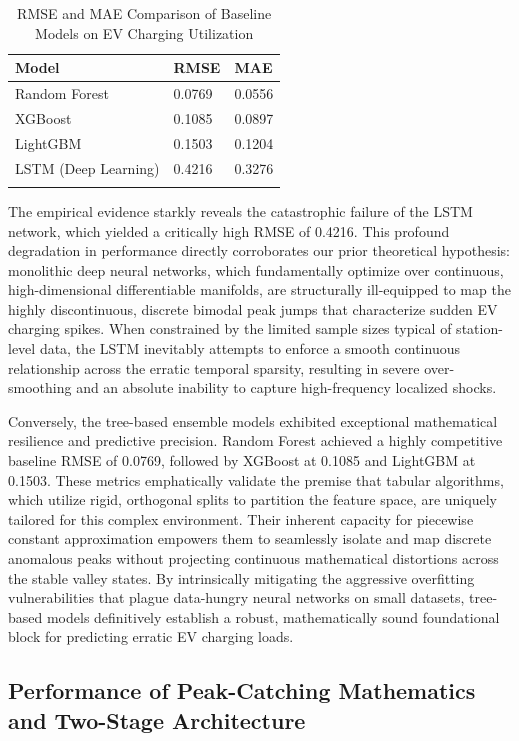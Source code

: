 \documentclass[pdflatex,sn-mathphys-num]{sn-jnl}%
\theoremstyle{thmstyleone}%
\theoremstyle{thmstyletwo}%
\theoremstyle{thmstylethree}%
\begin{document}
\begin{table}[h]
\caption{RMSE and MAE Comparison of Baseline Models on EV Charging Utilization}\label{tab:rmse_comparison}
\begin{tabular}{@{}lll@{}}
\toprule
Model & RMSE & MAE \\
\midrule
Random Forest & 0.0769 & 0.0556 \\
XGBoost & 0.1085 & 0.0897 \\
LightGBM & 0.1503 & 0.1204 \\
LSTM (Deep Learning) & 0.4216 & 0.3276 \\
\botrule
\end{tabular}
\end{table}

The empirical evidence starkly reveals the catastrophic failure of the LSTM network, which yielded a critically high RMSE of 0.4216. This profound degradation in performance directly corroborates our prior theoretical hypothesis: monolithic deep neural networks, which fundamentally optimize over continuous, high-dimensional differentiable manifolds, are structurally ill-equipped to map the highly discontinuous, discrete bimodal peak jumps that characterize sudden EV charging spikes. When constrained by the limited sample sizes typical of station-level data, the LSTM inevitably attempts to enforce a smooth continuous relationship across the erratic temporal sparsity, resulting in severe over-smoothing and an absolute inability to capture high-frequency localized shocks.

Conversely, the tree-based ensemble models exhibited exceptional mathematical resilience and predictive precision. Random Forest achieved a highly competitive baseline RMSE of 0.0769, followed by XGBoost at 0.1085 and LightGBM at 0.1503. These metrics emphatically validate the premise that tabular algorithms, which utilize rigid, orthogonal splits to partition the feature space, are uniquely tailored for this complex environment. Their inherent capacity for piecewise constant approximation empowers them to seamlessly isolate and map discrete anomalous peaks without projecting continuous mathematical distortions across the stable valley states. By intrinsically mitigating the aggressive overfitting vulnerabilities that plague data-hungry neural networks on small datasets, tree-based models definitively establish a robust, mathematically sound foundational block for predicting erratic EV charging loads.

\subsection{Performance of Peak-Catching Mathematics and Two-Stage Architecture}\label{subsec3_2}
\end{document}
